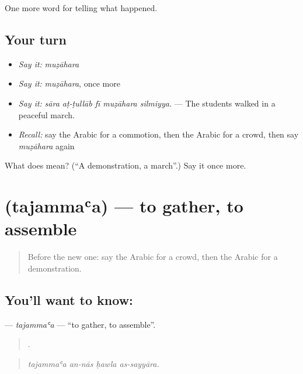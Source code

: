 \begin{grammarlens}[title={What you've built}]
One more word for telling what happened.
\end{grammarlens}

\subsection*{Your turn}
\begin{itemize}
\raggedright
  \item \emph{Say it:} \emph{muẓāhara}
  \item \emph{Say it:} \emph{muẓāhara}, once more
  \item \emph{Say it:} \emph{sāra aṭ-ṭullāb fī muẓāhara silmiyya.} — The students walked in a peaceful march.
  \item \emph{Recall:} say the Arabic for a commotion, then the Arabic for a crowd, then say \emph{muẓāhara} again
\end{itemize}

\begin{tcolorbox}[breakable,colback=teal!4,colframe=teal!35!black,title={Before you move on}]
What does  mean? (\textquotedblleft{}A demonstration, a march\textquotedblright{}.) Say it once more.
\end{tcolorbox}
\section[\texorpdfstring{\ar{تجمع} (tajammaʿa)}{تجمع (tajammaʿa)}]{ (tajammaʿa) — to gather, to assemble}

\label{lesson:AR-C353-tajammaa}



\begin{quote}
Before the new one: say the Arabic for a crowd, then the Arabic for a demonstration.
\end{quote}

\subsection*{You'll want to know: }
\textbf{} — \emph{tajammaʿa} — \textquotedblleft{}to gather, to assemble\textquotedblright{}.

\begin{quote}
   .
\end{quote}

\begin{quote}
\emph{tajammaʿa an-nās ḥawla as-sayyāra.}
\end{quote}

